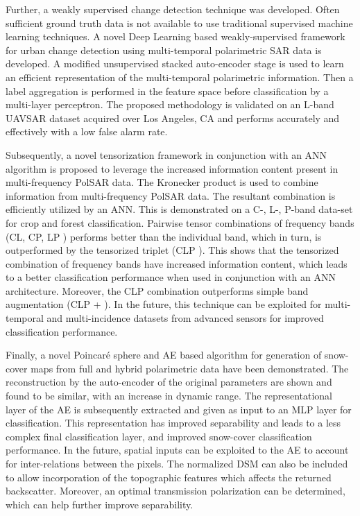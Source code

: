 \documentclass[12pt, a4paper]{article}
\begin{document}
Further, a weakly supervised change detection technique was developed. 
Often sufficient ground truth data is not available to use traditional supervised machine learning techniques. A novel Deep Learning based weakly-supervised framework for urban change detection using multi-temporal polarimetric SAR data is developed. A modified unsupervised stacked auto-encoder stage is used to learn an efficient representation of the multi-temporal polarimetric information. Then a label aggregation is performed in the feature space before classification by a multi-layer perceptron. The proposed methodology is validated on an L-band UAVSAR dataset acquired over Los Angeles, CA and performs accurately and effectively with a low false alarm rate.  

Subsequently, a novel tensorization framework in conjunction with an ANN algorithm is proposed to leverage the increased information content present in multi-frequency PolSAR data. The Kronecker product is used to combine information from multi-frequency PolSAR data. The resultant combination is efficiently utilized by an ANN. This is demonstrated on a C-, L-, P-band data-set for crop and forest classification. Pairwise tensor combinations of frequency bands (CL, CP, LP ) performs better than the individual band, which in turn, is outperformed by the tensorized triplet (CLP ). This shows that the tensorized combination of frequency bands have increased information content, which leads to a better classification performance when used in conjunction with an ANN architecture. Moreover, the CLP combination outperforms simple band
augmentation (CLP + ). In the future, this technique can be exploited for multi-temporal and multi-incidence datasets from advanced sensors for improved classification performance.

Finally, a novel Poincar\'e sphere and AE based algorithm for generation of snow-cover maps from full and hybrid polarimetric data have been demonstrated. The reconstruction by the auto-encoder of the original parameters are shown and found to be similar, with an increase in dynamic range. The representational layer of the AE is subsequently extracted and given as input to an MLP layer for classification. This representation has improved separability and leads to a less complex final classification layer, and improved snow-cover classification performance. 
In the future, spatial inputs can be exploited to the AE to account for inter-relations between the pixels. The normalized DSM can also be included to allow incorporation of the topographic features which affects the returned backscatter. 
Moreover, an optimal transmission polarization can be determined, which can help further improve separability. 
\end{document}
